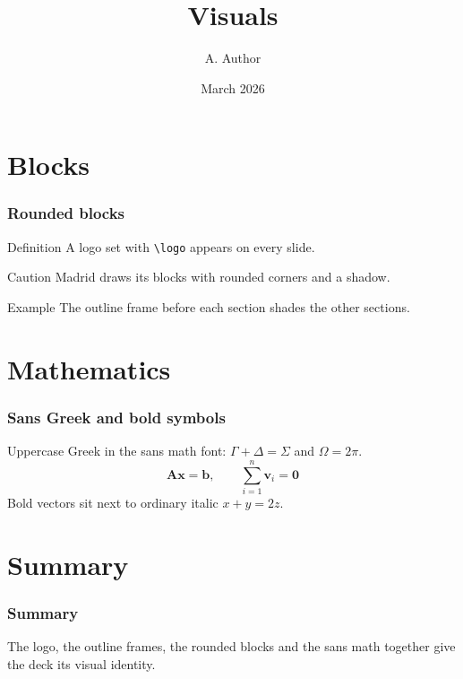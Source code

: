 \documentclass{beamer}
\title{Visuals}
\author{A. Author}
\date{March 2026}
\begin{document}
\begin{frame}
  \titlepage
\end{frame}

\section{Blocks}

\begin{frame}
  \frametitle{Rounded blocks}
  \begin{block}{Definition}
    A logo set with \texttt{\textbackslash logo} appears on every slide.
  \end{block}
  \begin{alertblock}{Caution}
    Madrid draws its blocks with rounded corners and a shadow.
  \end{alertblock}
  \begin{exampleblock}{Example}
    The outline frame before each section shades the other sections.
  \end{exampleblock}
\end{frame}

\section{Mathematics}

\begin{frame}
  \frametitle{Sans Greek and bold symbols}
  Uppercase Greek in the sans math font:
  $\Gamma + \Delta = \Sigma$ and $\Omega = 2\pi$.
  \[
    \mathbf{A}\mathbf{x} = \mathbf{b}, \qquad
    \sum_{i=1}^{n} \mathbf{v}_i = \mathbf{0}
  \]
  Bold vectors sit next to ordinary italic $x + y = 2z$.
\end{frame}

\section{Summary}

\begin{frame}
  \frametitle{Summary}
  The logo, the outline frames, the rounded blocks and the sans math
  together give the deck its visual identity.
\end{frame}
\end{document}
